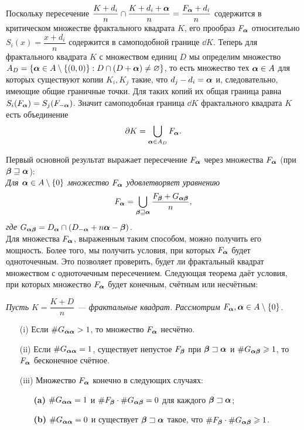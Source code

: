 Поскольку пересечение $\dfrac{K+d_i}{n}\cap\dfrac{K+d_i+{\bm{\alpha}}}{n}=\dfrac{F_{\bm{\alpha}}+d_i}{n}$ содержится в критическом множестве фрактального квадрата $K$,  его прообраз $F_{\bm{\alpha}}$ относительно $S_i(x)=\dfrac{x+d_i}{n}$ содержится в самоподобной границе $\dd K$.
Теперь для фрактального квадрата $K$ с множеством единиц $D$ мы определим множество 
$A_D=\{{\bm{\alpha}}\in A\setminus\{(0,0)\}: D\cap(D+{\bm{\alpha}})\neq\varnothing\}$, то есть множество тех ${\bm{\alpha}}\in A$ для которых существуют копии $K_i, K_j$ такие, что $d_j-d_i={\bm{\alpha}}$ и, следовательно, имеющие общие граничные точки. 
Для таких копий их общая граница равна $S_i(F_{\bm{\alpha}})=S_j(F_{-{\bm{\alpha}}})$. 
Значит самоподобная граница $\dd K$ фрактального квадрата $K$ есть объединение
$$\partial K=\bigcup\limits_{{\bm{\alpha}}\in A_D}F_{\bm{\alpha}}.$$

Первый основной результат выражает пересечение $F_{\bm{\alpha}}$ через множества $F_{\bm{\alpha}}$ (при ${\bm{\beta}}\sqsupseteq{\bm{\alpha}}$):\\

{\em Для ${\bm{\alpha}}\in A\setminus\{0\}$ множество $F_{\bm{\alpha}}$ удовлетворяет уравнению
$$ F_{\bm{\alpha}}=\bigcup\limits_{{\bm{\beta}}\sqsupseteq{\bm{\alpha}}} \dfrac{F_{\bm{\beta}}+G_{{\bm{\alpha}}{\bm{\beta}}}}{n},$$
где $G_{{\bm{\alpha}}{\bm{\beta}}}=D_{\bm{\alpha}}\cap(D_{-{\bm{\alpha}}}+n{\bm{\alpha}}-{\bm{\beta}})$.}\\

Для множества $F_{\bm{\alpha}}$, выраженным таким способом, можно получить его мощность.
Более того, мы  получить условия, при которых $F_{\bm{\alpha}}$ будет одноточечным. Это позволяет проверить, будет ли фрактальный квадрат множеством с одноточечным пересечением.
Следующая теорема даёт условия, при которых множество $F_{\bm{\alpha}}$ будет конечным, счётным или несчётным:

{\em Пусть $K=\dfrac{K+D}{n}$ --- фрактальные квадрат. Рассмотрим $F_{\bm{\alpha}}, {\bm{\alpha}}\in A\setminus\{0\}$.
\begin{itemize}[nolistsep]
 \item[(i)] Если $\#G_{{\bm{\alpha}}{\bm{\alpha}}}> 1$, то множество $F_{\bm{\alpha}}$ несчётно.
 \item[(ii)] Если $\#G_{{\bm{\alpha}}{\bm{\alpha}}}=1$, существует непустое $F_{\bm{\beta}}$ при ${\bm{\beta}}\sqsupset{\bm{\alpha}}$ и $\#G_{{\bm{\alpha}}{\bm{\beta}}}\geqslant1$, то $F_{\bm{\alpha}}$ бесконечное счётное.
 \item[(iii)] Множество $F_{\bm{\alpha}}$ конечно в следующих случаях:
 \begin{itemize}[nolistsep]
 \item[\textbf{(a)}] $\#G_{{\bm{\alpha}}{\bm{\alpha}}}=1$ и $\#F_{\bm{\beta}}\cdot\#G_{{\bm{\alpha}}{\bm{\beta}}}=0$ для каждого ${\bm{\beta}}\sqsupset{\bm{\alpha}}$;
 \item[\textbf{(b)}] $\#G_{{\bm{\alpha}}{\bm{\alpha}}}=0$ и существует ${\bm{\beta}}\sqsupset{\bm{\alpha}}$ такое, что $\#F_{\bm{\beta}}\cdot\#G_{{\bm{\alpha}}{\bm{\beta}}}\geqslant1$.
 \end{itemize}
\end{itemize}}

